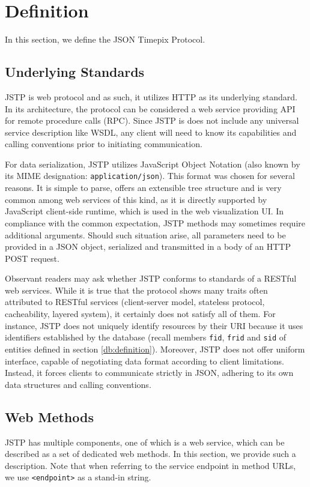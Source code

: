 \section{Definition}
In this section, we define the JSON Timepix Protocol.

\subsection{Underlying Standards}
JSTP is web protocol and as such, it utilizes HTTP as its underlying standard. In its architecture, the protocol can be considered a web service providing API for remote procedure calls (RPC). Since JSTP is does not include any universal service description like WSDL, any client will need to know its capabilities and calling conventions prior to initiating communication.

For data serialization, JSTP utilizes JavaScript Object Notation (also known by its MIME designation: \texttt{application/json}). This format was chosen for several reasons. It is simple to parse, offers an extensible tree structure and is very common among web services of this kind, as it is directly supported by JavaScript client-side runtime, which is used in the web visualization UI. In compliance with the common expectation, JSTP methods may sometimes require additional arguments. Should such situation arise, all parameters need to be provided in a JSON object, serialized and transmitted in a body of an HTTP POST request.

Observant readers may ask whether JSTP conforms to standards of a RESTful web services. While it is true that the protocol shows many traits often attributed to RESTful services (client-server model, stateless protocol, cacheability, layered system), it certainly does not satisfy all of them. For instance, JSTP does not uniquely identify resources by their URI because it uses identifiers established by the database (recall members \texttt{fid}, \texttt{frid} and \texttt{sid} of entities defined in section \ref{db:definition}). Moreover, JSTP does not offer uniform interface, capable of negotiating data format according to client limitations. Instead, it forces clients to communicate strictly in JSON, adhering to its own data structures and calling conventions.

\subsection{Web Methods}
JSTP has multiple components, one of which is a web service, which can be described as a set of dedicated web methods. In this section, we provide such a description. Note that when referring to the service endpoint in method URLs, we use \texttt{<endpoint>} as a stand-in string.

